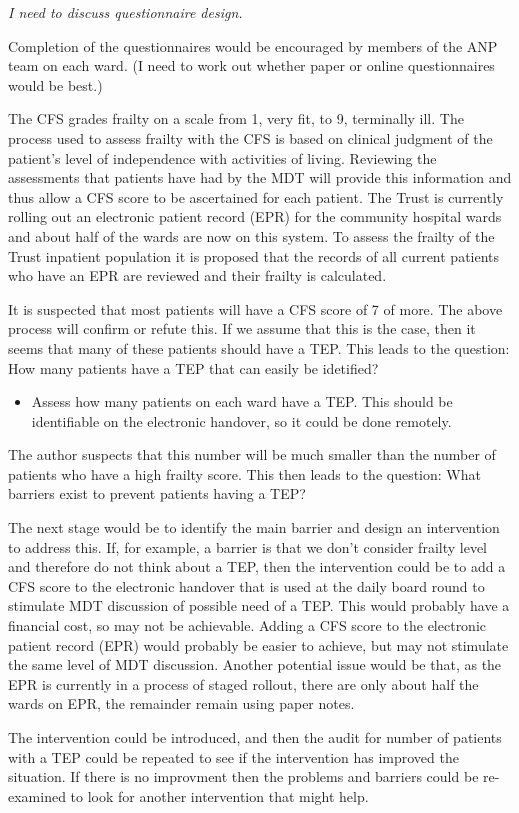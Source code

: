\documentclass[12pt,a4paper,oneside,titlepage]{article}
\begin{document}
\emph{I need to discuss questionnaire design.}

Completion of the questionnaires would be encouraged by members of the ANP team 
on each ward. (I need to work out whether paper or online questionnaires would be best.)

The CFS grades frailty on a scale from 1, very fit, to 9, terminally ill. The
process used to assess frailty with the CFS is based on clinical judgment of the 
patient's level of independence with activities of living. Reviewing the
assessments that patients have had by the MDT will provide this information
and thus allow a CFS score to be ascertained for each patient. The Trust is currently 
rolling out an electronic patient record (EPR) for the community hospital wards and 
about half of the wards are now on this system. To assess the 
frailty of the Trust inpatient population it is proposed that the records of all
current patients who have an EPR are reviewed and their frailty is calculated.



It is suspected that most patients will have a CFS score of 7 of more. The above process 
will confirm or refute this. If we assume that this is the case, then it seems
that many of these patients should have a TEP. This leads to the question: 
How many patients have a TEP that can easily be idetified?

\begin{itemize}

\item Assess how many patients on each ward have a TEP. This should be identifiable on 
	the electronic handover, so it could be done remotely.
\end{itemize}

The author suspects that this number will be much smaller than the number of patients 
who have a high frailty score. This then leads to the question: 
What barriers exist to prevent patients having a TEP?


The next stage would be to identify the main barrier and design an intervention to
address this. If, for example, a barrier is that we don't consider frailty level and
therefore do not think about a TEP, then the intervention could be to add a CFS score
to the electronic handover that is used at the daily board round to stimulate MDT
discussion of possible need of a TEP. This would probably have a financial cost, so
may not be achievable. Adding a CFS score to the electronic patient record (EPR) would 
probably be easier to achieve, but may not stimulate the same level of MDT discussion.
Another potential issue would be that, as the EPR is currently in a process of staged 
rollout, there are only about half the wards on EPR, the remainder remain using paper notes.

The intervention could be introduced, and then the audit for number of patients with 
a TEP could be repeated to see if the intervention has improved the situation. If there 
is no improvment then the problems and barriers could be re-examined to look for another
intervention that might help.

\clearpage
\printbibliography[prenote=needsfixing]
\end{document}
